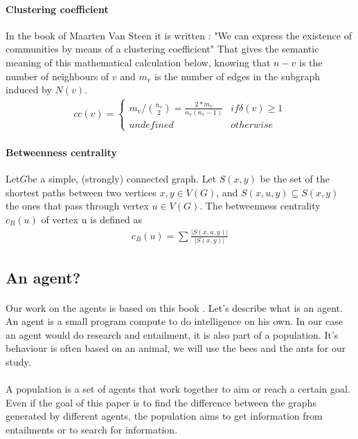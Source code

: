 \documentclass{article}
\begin{document}
		\paragraph{Clustering coefficient}
			In the book of Maarten Van Steen it is written :
			"We can express the existence of communities by means of a clustering coefficient"\cite{Steen10}
			That gives the semantic meaning of this mathematical calculation below,
			knowing that $n-v$ is the number of neighbours of $v$
			and $m_v$ is the number of edges in the subgraph induced by $N(v)$.
		\begin{align*}
			cc(v) = \begin{cases}
				m_v/ \binom{n_v}{2} = \frac{2*m_v}{n_v(n_v-1)} & if \delta(v) \ge 1 \\
				undefined & otherwise
			\end{cases}
		\end{align*}
		\paragraph{Betweenness centrality}
			Let$G$be a simple, (strongly) connected graph.
			Let $S(x, y)$ be the set of the shortest paths between two vertices $x, y \in V(G)$,
			and $S(x, u, y) \subseteq S(x, y)$ the ones that pass through vertex $u \in V (G)$.
			The betweenness centrality $c_B (u)$ of vertex u is defined as
		\begin{align*}
			c_B (u) = \sum \frac{|S(x,u,y)|}{|S(x,y)|}
		\end{align*}
	\subsection{An agent?}
	\paragraph{}
	Our work on the agents is based on this book \cite{Engelbrecht05}.
	Let's describe what is an agent.
	An agent is a small program compute to do intelligence on his own.
	In our case an agent would do research and entailment,
	it is also part of a population.
	It's behaviour is often based on an animal, we will use the bees and the ants for our study.
	\paragraph{}
	A population is a set of agents that work together to aim or reach a certain goal.
	Even if the goal of this paper is to find the difference between the graphs generated by different agents,
	the population aims to get information from entailments or to search for information.
\end{document}
